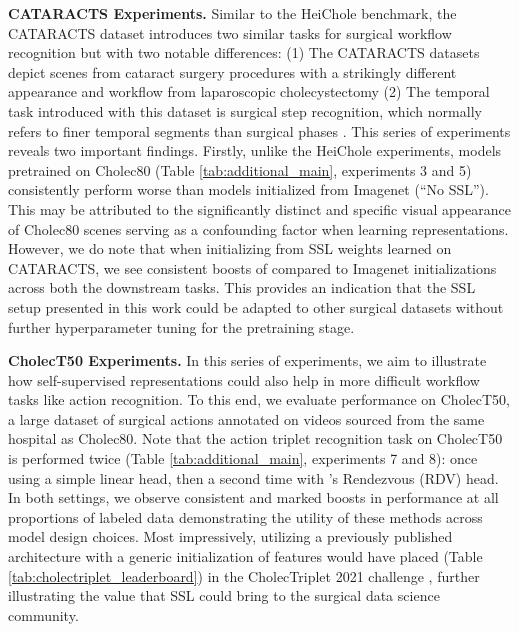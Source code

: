 \documentclass[times,twocolumn,final]{elsarticle}
\begin{document}
{\textbf{CATARACTS Experiments. } Similar to the HeiChole benchmark, the CATARACTS dataset introduces two similar tasks for surgical workflow recognition but with two notable differences: (1) The CATARACTS datasets depict scenes from cataract surgery procedures with a strikingly different appearance and workflow from laparoscopic cholecystectomy (2) The temporal task introduced with this dataset is surgical step recognition, which normally refers to finer temporal segments than surgical phases \citep{mascagni2022computer}. This series of experiments reveals two important findings. Firstly, unlike the HeiChole experiments, models pretrained on Cholec80 (Table \ref{tab:additional_main}, experiments 3 and 5) consistently perform worse than models initialized from Imagenet (``No SSL''). This may be attributed to the significantly distinct and specific visual appearance of Cholec80 scenes serving as a confounding factor when learning representations. However, we do note that when initializing from SSL weights learned on CATARACTS, we see consistent boosts of  compared to Imagenet initializations across both the downstream tasks. This provides an indication that the SSL setup presented in this work could be adapted to other surgical datasets without further hyperparameter tuning for the pretraining stage.

\textbf{CholecT50 Experiments. } In this series of experiments, we aim to illustrate how self-supervised representations could also help in more difficult workflow tasks like action recognition. To this end, we evaluate performance on CholecT50, a large dataset of surgical actions annotated on videos sourced from the same hospital as Cholec80. Note that the action triplet recognition task on CholecT50 is performed twice (Table \ref{tab:additional_main}, experiments 7 and 8): once using a simple linear head, then a second time with \cite{rdv}'s Rendezvous (RDV) head. In both settings, we observe consistent and marked boosts in performance at all proportions of labeled data demonstrating the utility of these methods across model design choices. Most impressively, utilizing a previously published architecture \citep{rdv} with a generic initialization of features would have placed  (Table \ref{tab:cholectriplet_leaderboard}) in the CholecTriplet 2021 challenge \citep{nwoye2022cholectriplet2021}, further illustrating the value that SSL could bring to the surgical data science community.

}
\end{document}
